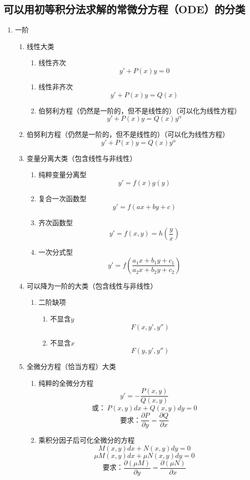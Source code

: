 \documentclass[UTF8]{ctexart}
\begin{document}
\subsection{可以用初等积分法求解的常微分方程（ODE）的分类}
\begin{enumerate}
    \item 一阶
    \begin{enumerate}
        \item 线性大类
        \begin{enumerate}
            \item 线性齐次\[y'+P(x)y=0\]


        \end{enumerate}
        \begin{enumerate}
            \item 线性非齐次\[y'+P(x)y=Q(x)\]
            \item 伯努利方程（仍然是一阶的，但不是线性的）（可以化为线性方程）\[y'+P(x)y=Q(x)y^{\alpha}\]
        
        \end{enumerate}
        \item 伯努利方程（仍然是一阶的，但不是线性的）（可以化为线性方程）\[y'+P(x)y=Q(x)y^{\alpha}\]
        \item 变量分离大类（包含线性与非线性）
        \begin{enumerate}
            \item 纯粹变量分离型\[y'=f(x)g(y)\]
            \item 复合一次函数型\[y'=f(ax+by+c)\]
            \item 齐次函数型\[y'=f(x,y)=h(\frac{y}{x})\]
            \item 一次分式型\[y'=f(\frac{a_1x+b_1y+c_1}{a_2x+b_2y+c_2})\]

        \end{enumerate}
        \item 可以降为一阶的大类（包含线性与非线性）
        \begin{enumerate}
            \item 二阶缺项
            \begin{enumerate}
                \item 不显含$y$\[F(x,y',y'')\]
                \item 不显含$x$\[F(y,y',y'')\]

            \end{enumerate}

        \end{enumerate}
        \item 全微分方程（恰当方程）大类
        \begin{enumerate}
            \item 纯粹的全微分方程\[y'=-\frac{P(x,y)}{Q(x,y)}\]\[\text{或：}\ P(x,y)dx +Q(x,y)dy=0\]\[\text{要求：}\frac{\partial P}{\partial y}=\frac{\partial Q}{\partial x}\]
            \item 乘积分因子后可化全微分的方程\[M(x,y)dx +N(x,y)dy=0\]\[\mu M(x,y)dx +\mu N(x,y)dy=0\]\[\text{要求：}\frac{\partial (\mu M)}{\partial y}=\frac{\partial(\mu N)}{\partial x}\]


\end{enumerate}
\end{enumerate}
\end{enumerate}
\end{document}
